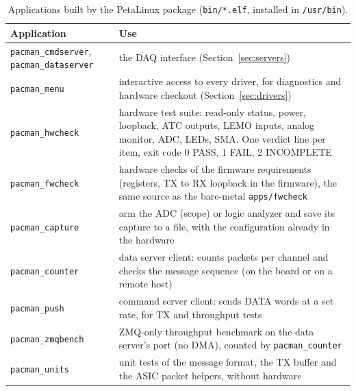 \documentclass[12pt]{article}
\newcommand{\f}[1]{\texttt{#1}}
\begin{document}
\begin{table}[H]
\centering\small
\begin{tabularx}{\linewidth}{lL}
\toprule
Application & Use \\
\midrule
\f{pacman\_cmdserver}, \f{pacman\_dataserver} & the DAQ interface (Section~\ref{sec:servers}) \\
\f{pacman\_menu} & interactive access to every driver, for diagnostics and hardware checkout
  (Section~\ref{sec:drivers}) \\
\f{pacman\_hwcheck} & hardware test suite:  read-only status, power, loopback, ATC outputs, LEMO
  inputs, analog monitor, ADC, LEDs, SMA.  One verdict line per item, exit code 0 PASS, 1 FAIL, 2
  INCOMPLETE \\
\f{pacman\_fwcheck} & hardware checks of the firmware requirements (registers, TX to RX loopback in
  the firmware), the same source as the bare-metal \f{apps/fwcheck} \\
\f{pacman\_capture} & arm the ADC (scope) or logic analyzer and save its capture to a file, with the
  configuration already in the hardware \\
\f{pacman\_counter} & data server client:  counts packets per channel and checks the message sequence
  (on the board or on a remote host) \\
\f{pacman\_push} & command server client:  sends DATA words at a set rate, for TX and throughput
  tests \\
\f{pacman\_zmqbench} & ZMQ-only throughput benchmark on the data server's port (no DMA), counted by
  \f{pacman\_counter} \\
\f{pacman\_units} & unit tests of the message format, the TX buffer and the ASIC packet helpers, without
  hardware \\
\bottomrule
\end{tabularx}
\caption{Applications built by the PetaLinux package (\f{bin/*.elf}, installed in \f{/usr/bin}).}
\label{tbl:apps}
\end{table}
\end{document}
